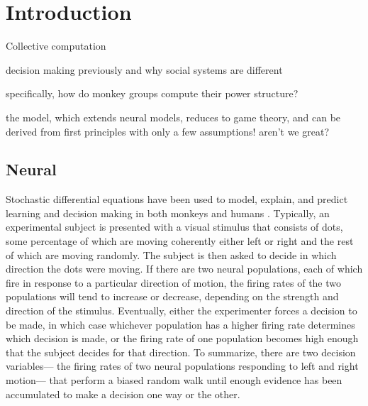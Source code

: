 \documentclass{article}
\begin{document}
\section{Introduction}

Collective computation

decision making previously and why social systems are different

specifically, how do monkey groups compute their power structure?

the model, which extends neural models, reduces to game theory, and can be derived from first principles with only a few assumptions!  aren't we great?

\subsection{Neural }
Stochastic differential equations have been used to model, explain, and predict learning and decision making in both monkeys and humans \citep{Eckhoff:2008uq, Brown:2005fk,Feng:2009kl,Bogacz:2006uq}.  Typically, an experimental subject is presented with a visual stimulus that consists of dots, some percentage of which are moving coherently either left or right and the rest of which are moving randomly.  The subject is then asked to decide in which direction the dots were moving.  If there are two neural populations, each of which fire in response to a particular direction of motion, the firing rates of the two populations will tend to increase or decrease, depending on the strength and direction of the stimulus.  Eventually, either the experimenter forces a decision to be made, in which case whichever population has a higher firing rate determines which decision is made, or the firing rate of one population becomes high enough that the subject decides for that direction.  To summarize, there are two decision variables--- the firing rates of two neural populations responding to left and right motion--- that perform a biased random walk until enough evidence has been accumulated to make a decision one way or the other.
\end{document}
